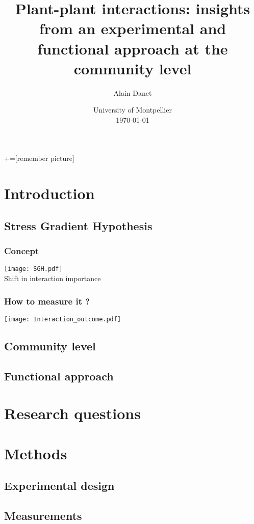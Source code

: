 \documentclass{beamer}[12pt]
\title{Plant-plant interactions: insights from an experimental and functional approach at the community level}
\author{Alain Danet}
\institute{Supervised by\\Susana Bautista \& Sonia Kefi}
\date{University of Montpellier\\ \today}
\begin{document}
   +=[remember picture]
   \everymath{\displaystyle}   
   
   \begin{frame}
\titlepage
\end{frame}

\section{Introduction}

\subsection{Stress Gradient Hypothesis}

\begin{frame}\frametitle{Concept}
\texttt{[image: SGH.pdf]} \\
\vfill
Shift in interaction importance
\end{frame}

\begin{frame}\frametitle{How to measure it ?}
	\texttt{[image: Interaction\_outcome.pdf]}
\end{frame}

\subsection{Community level}

\subsection{Functional approach}

\section{Research questions}

\section{Methods}

\subsection{Experimental design}

\subsection{Measurements}
\end{document}
